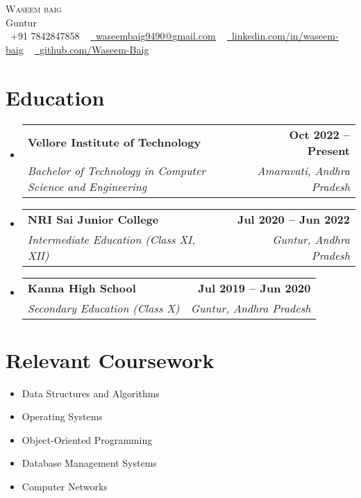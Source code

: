 \documentclass[letterpaper,11pt]{article}
\makeatletter
\newcommand{\resumeSubheading}[4]{
  \vspace{-2pt}\item
    \begin{tabular*}{1.0\textwidth}[t]{l@{\extracolsep{\fill}}r}
      \textbf{#1} & \textbf{\small #2} \\
      \textit{\small#3} & \textit{\small #4} \\
    \end{tabular*}\vspace{-7pt}
}
\newcommand{\resumeSubHeadingListStart}{\begin{itemize}[leftmargin=0.0in, label={}]}
\newcommand{\resumeSubHeadingListEnd}{\end{itemize}}
\makeatother
\begin{document}
\begin{center}
    {\Huge \scshape Waseem baig} \\ \vspace{1pt}
    Guntur \\ \vspace{1pt}
    \small \raisebox{-0.1\height}\faPhone\ +91 7842847858 ~ \href{mailto:waseembaig9490@gmail.com}{\raisebox{-0.2\height}\faEnvelope\  \underline{waseembaig9490@gmail.com}} ~ 
    \href{https://linkedin.com/in/waseem-baig}{\raisebox{-0.2\height}\faLinkedin\ \underline{linkedin.com/in/waseem-baig}}  ~
    \href{https://github.com/Waseem-Baig}{\raisebox{-0.2\height}\faGithub\ \underline{github.com/Waseem-Baig}}
    \vspace{-8pt}
\end{center}

\section{Education}
  \resumeSubHeadingListStart
    \resumeSubheading
      {Vellore Institute of Technology}{Oct 2022 -- Present}
      {Bachelor of Technology in Computer Science and Engineering}{Amaravati, Andhra Pradesh}
    \resumeSubheading
      {NRI Sai Junior College}{Jul 2020 -- Jun 2022}
      {Intermediate Education (Class XI, XII)}{Guntur, Andhra Pradesh}
    \resumeSubheading
      {Kanna High School}{Jul 2019 -- Jun 2020}
      {Secondary Education (Class X)}{Guntur, Andhra Pradesh}
  \resumeSubHeadingListEnd



\section{Relevant Coursework}
    \begin{multicols}{4}
        \begin{itemize}[itemsep=-5pt, parsep=3pt]
            \item\small Data Structures and Algorithms
            \item\small Operating Systems
            \item\small Object-Oriented Programming
            \item\small Database Management Systems
            \item\small Computer Networks
        \end{itemize}
    \end{multicols}
    \vspace*{2.0\multicolsep}
\end{document}
